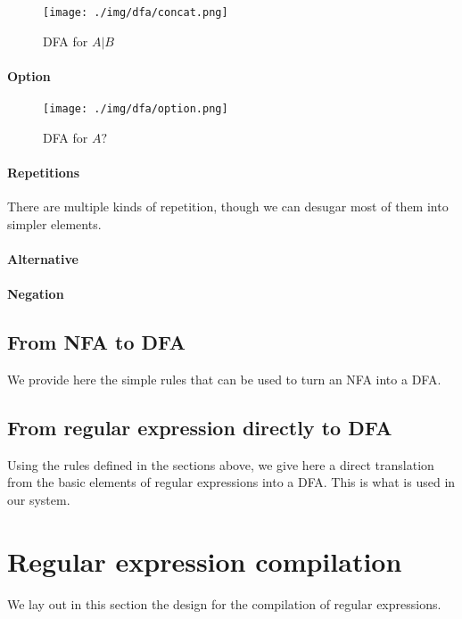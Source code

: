 \documentclass[11pt,a4paper]{report}
\newcommand{\regexp}[1]{$#1$}
\begin{document}
\begin{figure}[h!]
	\centering
	\texttt{[image: ./img/dfa/concat.png]}
	\caption{DFA for \regexp{A|B}}
\end{figure}

\subsubsection{Option}

\begin{figure}
	\centering
	\texttt{[image: ./img/dfa/option.png]}
	\caption{DFA for \regexp{A?}}
\end{figure}

\subsubsection{Repetitions}

There are multiple kinds of repetition, though we can desugar most of them into simpler elements.

\subsubsection{Alternative}

\subsubsection{Negation}

\section{From NFA to DFA}

We provide here the simple rules that can be used to turn an NFA into a DFA.

\section{From regular expression directly to DFA}

Using the rules defined in the sections above, we give here a direct translation from the basic elements of regular expressions into a DFA. This is what is used in our system.


\chapter{Regular expression compilation}

We lay out in this section the design for the compilation of regular expressions.
\end{document}
